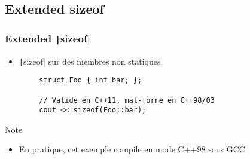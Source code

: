 \documentclass[C++.tex]{subfiles}
\begin{document}
\subsection*{Extended sizeof}
\begin{frame}[fragile]
	\frametitle{Extended \texttt|sizeof|}
	\begin{itemize}
		\item \texttt|sizeof| sur des membres non statiques
	\end{itemize}

	\begin{verbatim}
		struct Foo { int bar; };

		// Valide en C++11, mal-forme en C++98/03
		cout << sizeof(Foo::bar);
	\end{verbatim}


	\begin{block}{Note}
		\begin{itemize}
			\item En pratique, cet exemple compile en mode C++98 sous GCC
		\end{itemize}

	\end{block}
\end{frame}
\end{document}

